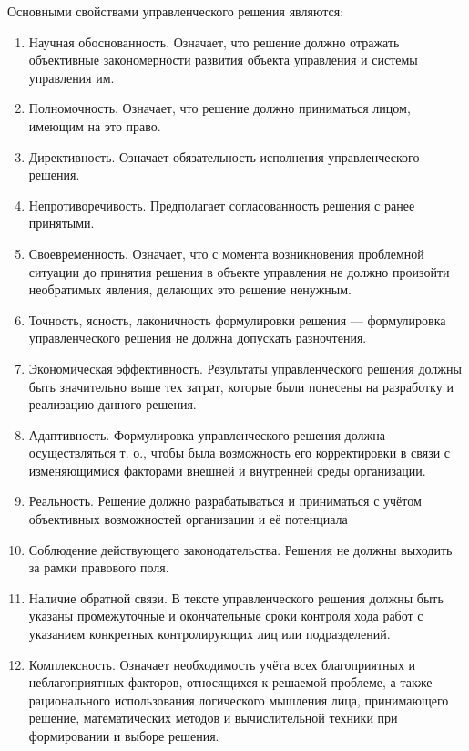 \documentclass[12pt, russian, oneside, article]{ncc}
\begin{document}
Основными свойствами управленческого решения являются:
\begin{enumerate}
\item Научная обоснованность. Означает, что решение должно отражать объективные закономерности развития объекта управления и системы управления им.
\item Полномочность. Означает, что решение должно приниматься лицом, имеющим на это право.
\item Директивность. Означает обязательность исполнения управленческого решения.
\item Непротиворечивость. Предполагает согласованность решения с ранее принятыми.
\item Своевременность. Означает, что с момента возникновения проблемной ситуации до принятия решения в объекте управления не должно произойти необратимых явления, делающих это решение ненужным.
\item Точность, ясность, лаконичность формулировки решения --- формулировка управленческого решения не должна допускать разночтения.
\item Экономическая эффективность. Результаты управленческого решения должны быть значительно выше тех затрат, которые были понесены на разработку и реализацию данного решения.
\item Адаптивность. Формулировка управленческого решения должна осуществляться т. о., чтобы была возможность его корректировки в связи с изменяющимися факторами внешней и внутренней среды организации.
\item Реальность. Решение должно разрабатываться и приниматься с учётом объективных возможностей организации и её потенциала
\item Соблюдение действующего законодательства. Решения не должны выходить за рамки правового поля.
\item Наличие обратной связи. В тексте управленческого решения должны быть указаны промежуточные и окончательные сроки контроля хода работ с указанием конкретных контролирующих лиц или подразделений.
\item Комплексность. Означает необходимость учёта всех благоприятных и неблагоприятных факторов, относящихся к решаемой проблеме, а также рационального использования логического мышления лица, принимающего решение, математических методов и вычислительной техники при формировании и выборе решения.
\end{enumerate}
\end{document}

